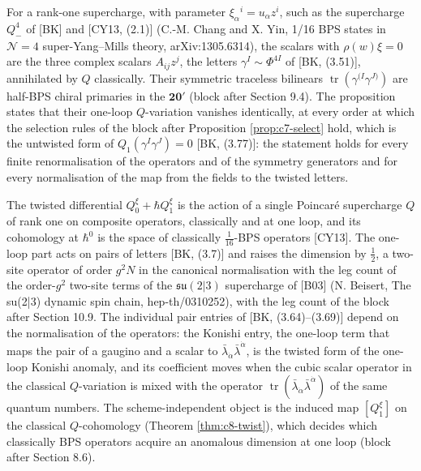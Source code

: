 \begin{remark}
For a rank-one supercharge, with parameter $\xi_\alpha{}^i=u_\alpha z^i$, such as the supercharge $Q^4_-$ of [BK] and [CY13, (2.1)] (C.-M. Chang and X. Yin, 1/16 BPS states in $\mathcal N=4$ super-Yang--Mills theory, arXiv:1305.6314), the scalars with $\rho(w)\xi=0$ are the three complex scalars $A_{ij}z^j$, the letters $\gamma^I\sim\Phi^{4I}$ of [BK, (3.51)], annihilated by $Q$ classically. Their symmetric traceless bilinears $\operatorname{tr}(\gamma^{(I}\gamma^{J)})$ are half-BPS chiral primaries in the $\mathbf{20'}$ (block after Section 9.4). The proposition states that their one-loop $Q$-variation vanishes identically, at every order at which the selection rules of the block after Proposition \ref{prop:c7-select} hold, which is the untwisted form of $Q_1(\gamma^I\gamma^J)=0$ [BK, (3.77)]: the statement holds for every finite renormalisation of the operators and of the symmetry generators and for every normalisation of the map from the fields to the twisted letters.
\end{remark}

\begin{remark}
The twisted differential $Q^\xi_0+\hbar Q^\xi_1$ is the action of a single Poincar\'e supercharge $Q$ of rank one on composite operators, classically and at one loop, and its cohomology at $\hbar^0$ is the space of classically $\tfrac1{16}$-BPS operators [CY13]. The one-loop part acts on pairs of letters [BK, (3.7)] and raises the dimension by $\tfrac12$, a two-site operator of order $g^2N$ in the canonical normalisation with the leg count of the order-$g^2$ two-site terms of the $\mathfrak{su}(2|3)$ supercharge of [B03] (N. Beisert, The su(2|3) dynamic spin chain, hep-th/0310252), with the leg count of the block after Section 10.9. The individual pair entries of [BK, (3.64)--(3.69)] depend on the normalisation of the operators: the Konishi entry, the one-loop term that maps the pair of a gaugino and a scalar to $\bar\lambda_{\dot\alpha}\bar\lambda^{\dot\alpha}$, is the twisted form of the one-loop Konishi anomaly, and its coefficient moves when the cubic scalar operator in the classical $Q$-variation is mixed with the operator $\operatorname{tr}(\bar\lambda_{\dot\alpha}\bar\lambda^{\dot\alpha})$ of the same quantum numbers. The scheme-independent object is the induced map $[Q^\xi_1]$ on the classical $Q$-cohomology (Theorem \ref{thm:c8-twist}), which decides which classically BPS operators acquire an anomalous dimension at one loop (block after Section 8.6).
\end{remark}

